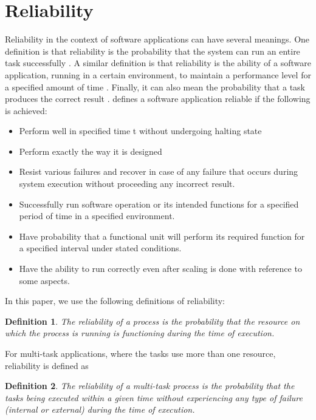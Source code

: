 \documentclass{cslthse-msc}
\newtheorem{definition}{Definition}[chapter]
\begin{document}
\section{Reliability} \label{sec:theory_reliability}
Reliability in the context of software applications can have several meanings. One definition is that reliability is the probability that the system can run an entire task successfully \cite{taskAllocation}. A similar definition is that reliability is the ability of a software application, running in a certain environment, to maintain a performance level for a specified amount of time \cite{X}. Finally, it can also mean the probability that a task produces the correct result \cite{X}. \cite{surveyReliabilityDistr} defines a software application reliable if the following is achieved:
\begin{itemize}
\item Perform well in specified time t without undergoing halting state
\item Perform exactly the way it is designed
\item Resist various failures and recover in case of any failure that occurs during system execution without proceeding any incorrect result.
\item Successfully run software operation or its intended functions for a specified period of time in a specified environment.
\item Have probability that a functional unit will perform its required function for a specified interval under stated conditions.
\item Have the ability to run correctly even after scaling is done with reference to some aspects.
\end{itemize}

In this paper, we use the following definitions of reliability:
\begin{definition} \label{def:single_task_reliability}
The reliability of a process is the probability that the resource on which the process is running is functioning during the time of execution.
\end{definition}

For multi-task applications, where the tasks use more than one resource, reliability is defined as
\begin{definition} \label{def:multi_task_reliability}
The reliability of a multi-task process is the probability that the tasks being executed within a given time without experiencing any type of failure (internal or external) during the time of execution.
\end{definition}
\end{document}
